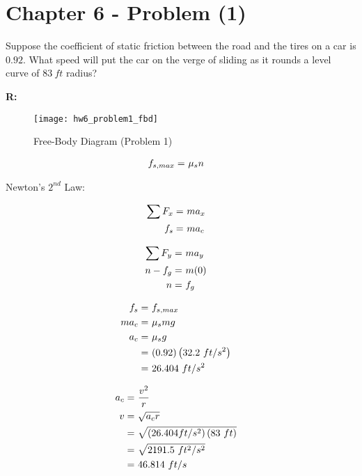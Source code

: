 \section{Chapter 6 - Problem (1)}
	Suppose the coefficient of static friction between the road and the tires on a car is $0.92$. What speed will put the car on the verge of sliding as it rounds a level curve of $83 \ ft$ radius?

	\textbf{R:} \newline

	\begin{figure}[H]
		\begin{center}
			\texttt{[image: hw6\_problem1\_fbd]}
			\caption{Free-Body Diagram (Problem 1)}
			\label{fig:hw6_problem1_fbd}
		\end{center}
	\end{figure}

	\begin{align}
		f_{s,max} = \ &\mu_{s}n& \notag
	\end{align}

	Newton's $2^{nd}$ Law:

	\begin{align}
		\sum F_{x} = \ &ma_{x}& \notag \\
		f_{s} = \ &ma_{c}& \notag
	\end{align}

	\begin{align}
		\sum F_{y} = \ &ma_{y}& \notag \\
		n - f_{g} = \ &m(0)& \notag \\
		n = \ &f_{g}& \notag
	\end{align}

	\begin{align}
		f_{s} = \ &f_{s,max}& \notag \\
		ma_{c} = \ &\mu_{s}mg& \notag \\
		a_{c} = \ &\mu_{s}g& \notag \\
		= \ &(0.92)\left(32.2 \ ft/s^{2}\right)& \notag \\
		= \ &26.404 \ ft/s^{2}& \notag
	\end{align}

	\begin{align}
		a_{c} = \ &\frac{v^{2}}{r}& \notag \\
		v = \ &\sqrt{a_{c}r}& \notag \\
		= \ &\sqrt{\left(26.404 ft/s^{2}\right)(83 \ ft)}& \notag \\
		= \ &\sqrt{2191.5 \ ft^{2}/s^{2}}& \notag \\
		= \ &46.814 \ ft/s&
	\end{align}
